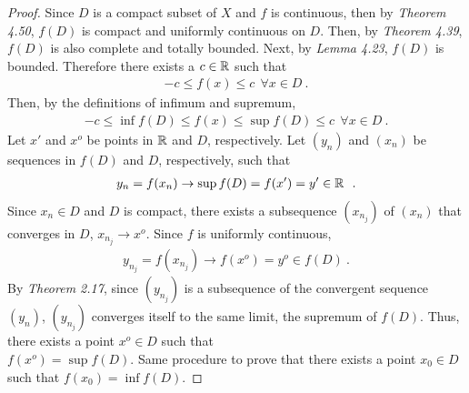 \begin{questions}


\begin{solution}
  \begin{proof}
  Since $D$ is a compact subset of $X$ and $f$ is continuous, then by \textit{Theorem 4.50}, $f(D)$ is compact and uniformly continuous on $D$. Then, by \textit{Theorem 4.39}, $f(D)$ is also complete and totally bounded. Next, by \textit{Lemma 4.23}, $f(D)$ is bounded. Therefore there exists a $c\in\mathbb{R}$ such that
  \begin{align*}
  -c\leq f(x)\leq c~~\forall x\in D~.
  \end{align*}
  Then, by the definitions of infimum and supremum,
  \begin{align*}
  -c\leq\inf f(D)\leq f(x)\leq\sup f(D)\leq c~~\forall x\in D~.  
  \end{align*}
  Let $x'$ and $x^o$ be points in $\mathbb{R}$ and $D$, respectively. Let $(y_n)$ and $(x_n)$ be sequences in $f(D)$ and $D$, respectively, such that
  \begin{align*}
	y_n=f(x_n)\rightarrow\sup f(D)= f(x')=y'\in \mathbb{R}~~.
\end{align*}
Since $x_n\in D$ and $D$ is compact, there exists a subsequence $(x_{n_j})$ of $(x_n)$ that converges in $D$, $x_{n_j}\rightarrow x^o$. Since $f$ is uniformly continuous,
\begin{align*}
y_{n_j}=f(x_{n_j})\rightarrow f(x^o)=y^o\in f(D)~.
\end{align*}
By \textit{Theorem 2.17}, since $(y_{n_j})$ is a subsequence of the convergent sequence $(y_n)$, $(y_{n_j})$ converges itself to the same limit, the supremum of $f(D)$. Thus, there exists a point $x^o\in D$ such that\\ $f(x^o)=\sup f(D)$. Same procedure to prove that there exists a point $x_0\in D$ such that $f(x_0)=\inf f(D)$.
\end{proof}
\end{solution}
\end{questions}